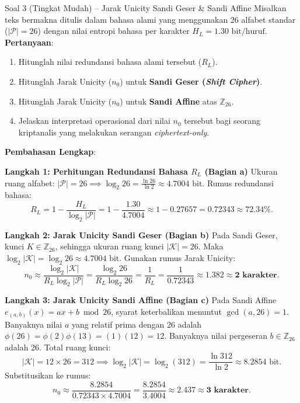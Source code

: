\documentclass[11pt,a4paper]{article}
\begin{document}
\begin{soalmudah}{Soal 3 (Tingkat Mudah) -- Jarak Unicity Sandi Geser \& Sandi Affine}
Misalkan teks bermakna ditulis dalam bahasa alami yang menggunakan 26 alfabet standar ($|\mathcal{P}| = 26$) dengan nilai entropi bahasa per karakter $H_L = 1.30\text{ bit/huruf}$.
\textbf{Pertanyaan}:
\begin{enumerate}[label=\alph*)]
    \item Hitunglah nilai redundansi bahasa alami tersebut ($R_L$).
    \item Hitunglah Jarak Unicity ($n_0$) untuk \textbf{Sandi Geser (\textit{Shift Cipher})}.
    \item Hitunglah Jarak Unicity ($n_0$) untuk \textbf{Sandi Affine} atas $\mathbb{Z}_{26}$.
    \item Jelaskan interpretasi operasional dari nilai $n_0$ tersebut bagi seorang kriptanalis yang melakukan serangan \textit{ciphertext-only}.
\end{enumerate}
\end{soalmudah}

\noindent\textbf{Pembahasan Lengkap}:

\noindent\textbf{Langkah 1: Perhitungan Redundansi Bahasa $R_L$ (Bagian a)}
Ukuran ruang alfabet: $|\mathcal{P}| = 26 \implies \log_2 26 = \frac{\ln 26}{\ln 2} \approx 4.7004\text{ bit}$.
Rumus redundansi bahasa:
\begin{equation}
R_L = 1 - \frac{H_L}{\log_2 |\mathcal{P}|} = 1 - \frac{1.30}{4.7004} \approx 1 - 0.27657 = \mathbf{0.72343} \approx \mathbf{72.34\%}.
\end{equation}

\noindent\textbf{Langkah 2: Jarak Unicity Sandi Geser (Bagian b)}
Pada Sandi Geser, kunci $K \in \mathbb{Z}_{26}$, sehingga ukuran ruang kunci $|\mathcal{K}| = 26$.
Maka $\log_2 |\mathcal{K}| = \log_2 26 \approx 4.7004\text{ bit}$.
Gunakan rumus Jarak Unicity:
\begin{equation}
\label{eq:unicity_formula}
n_0 \approx \frac{\log_2 |\mathcal{K}|}{R_L \log_2 |\mathcal{P}|} = \frac{\log_2 26}{R_L \log_2 26} = \frac{1}{R_L} = \frac{1}{0.72343} \approx 1.382 \approx \mathbf{2\text{ karakter}}.
\end{equation}

\noindent\textbf{Langkah 3: Jarak Unicity Sandi Affine (Bagian c)}
Pada Sandi Affine $e_{(a,b)}(x) = ax + b \bmod 26$, syarat keterbalikan menuntut $\gcd(a, 26) = 1$.
Banyaknya nilai $a$ yang relatif prima dengan 26 adalah $\phi(26) = \phi(2)\phi(13) = (1)(12) = 12$.
Banyaknya nilai pergeseran $b \in \mathbb{Z}_{26}$ adalah 26.
Total ruang kunci:
\[
|\mathcal{K}| = 12 \times 26 = 312 \implies \log_2 |\mathcal{K}| = \log_2(312) = \frac{\ln 312}{\ln 2} \approx 8.2854\text{ bit}.
\]
Substitusikan ke rumus:
\[
n_0 \approx \frac{8.2854}{0.72343 \times 4.7004} = \frac{8.2854}{3.4004} \approx 2.437 \approx \mathbf{3\text{ karakter}}.
\]
\end{document}
